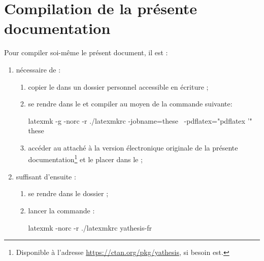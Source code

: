 \chapter{Compilation de la présente documentation}\label{cha-comp-de-la-pres}

%

Pour compiler soi-même le présent document, il est :
\begin{enumerate}
\item nécessaire de :
  \begin{enumerate}
  \item copier le  dans un
    dossier personnel accessible en écriture ;
  \item se rendre dans le  et compiler
     au moyen de la commande suivante\uneseuleligne :
\begin{listingshell}[before=\smallskip]
latexmk -g -norc -r ./latexmkrc -jobname=these \
-pdflatex="pdflatex %
\AtEndPreamble{\RequirePackage{yathesis-demo}} '" these
\end{listingshell}
%
\item accéder au  attaché à la version électronique
  originale de la présente documentation\footnote{Disponible à l'adresse
    \url{https://ctan.org/pkg/yathesis}, si besoin est.} et le placer dans le
  \Folder{../exemples} ;
\end{enumerate}
\item suffisant d'ensuite :
  \begin{enumerate}
  \item se rendre dans le dossier  ;
  \item lancer la commande :
%
\begin{listingshell}[before=\medskip]
latexmk -norc -r ./latexmkrc yathesis-fr
\end{listingshell}
%
  \end{enumerate}
\end{enumerate}

